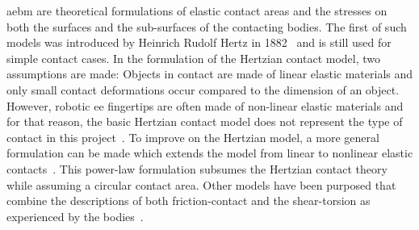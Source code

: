 \gls{aebm} are theoretical formulations of elastic contact areas and the stresses on both the surfaces and the sub-surfaces of the contacting bodies. The first of such models was introduced by Heinrich Rudolf Hertz in \num{1882}~\cite{on-the-contact-of-rigid-elastic-solids-and-on-hardness} and is still used for simple contact cases. In the formulation of the Hertzian contact model, two assumptions are made: Objects in contact are made of linear elastic materials and only small contact deformations occur compared to the dimension of an object. However, robotic \gls{ee} fingertips are often made of non-linear elastic materials and for that reason, the basic Hertzian contact model does not represent the type of contact in this project~\cite[Chapter 37]{handbook-of-robotics}. To improve on the Hertzian model, a more general formulation can be made which extends the model from linear to nonlinear elastic contacts~\cite{modeling-of-contact-mechanics-and-friction-limit-surfaces-for-soft-fingers-in-robotics-with-experimental-results, the-haptic-and-perceptional-characteristics-of-an-anthropomorphic-curved-soft-finger-structure}. This power-law formulation subsumes the Hertzian contact theory while assuming a circular contact area. Other models have been purposed that combine the descriptions of both friction-contact and the shear-torsion as experienced by the bodies~\cite{the-sliding-of-robot-fingers-under-combined-torsion-and-shear-loading}. \medskip

